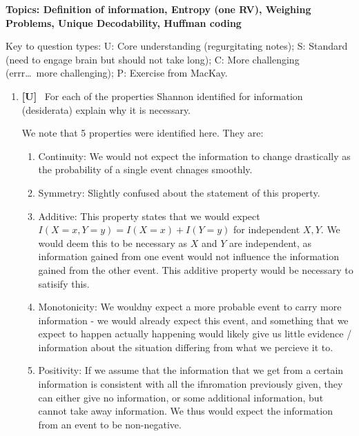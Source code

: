 \documentclass[10pt,\jkfside,a4paper]{article}
\newcommand{\answer}[1]{
    \begin{tcolorbox}[colframe=black, colback=white, sharp corners, boxrule=0.2mm, breakable]
        #1
    \end{tcolorbox}
}
\newcommand{\qtype}[1]{\textbf{[#1]}~}
\begin{document}

\textbf{Topics: Definition of information, Entropy (one RV), Weighing Problems, Unique Decodability, Huffman coding}

{\small
Key to question types:
U: Core understanding (regurgitating notes);
S: Standard (need to engage brain but should not take long);
C: More challenging (errr\ldots\ more challenging);
P: Exercise from MacKay.
}

\begin{enumerate}
    \item
    \qtype{U}
    For each of the properties Shannon identified for information (desiderata) explain why it is necessary.

    \answer{
        We note that 5 properties were identified here. They are: 

        \begin{enumerate} 
            \item 
            Continuity: We would not expect the information to change drastically as the probability of a single event chnages smoothly.

            \item 
            Symmetry: Slightly confused about the statement of this property.

            \item 
            Additive: This property states that we would expect $I(X=x, Y=y) = I(X=x) + I(Y=y)$ for independent $X, Y$. We would deem this to be necessary as $X$ and $Y$ are independent, as information gained from one event would not influence the information gained from the other event. This additive property would be necessary to satisify this. 

            \item 
            Monotonicity: We wouldny expect a more probable event to carry more information - we would already expect this event, and something that we expect to happen actually happening would likely give us little evidence / information about the situation differing from what we percieve it to. 

            \item 
            Positivity: If we assume that the information that we get from a certain information is consistent with all the ifnromation previously given, they can either give no information, or some additional information, but cannot take away information. We thus would expect the information from an event to be non-negative.
        \end{enumerate}
    }


\end{enumerate}
\end{document}
